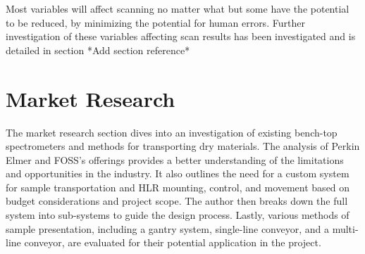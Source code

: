 \documentclass{UoNMCHA}
\numberwithin{equation}{section}
\begin{document}
Most variables will affect scanning no matter what but some have the potential to be reduced, by minimizing the potential for human errors. Further investigation of these variables affecting scan results has been investigated and is detailed in section *Add section reference*\\
\newpage
\section{Market Research}\label{sec:Market Research}
The market research section dives into an investigation of existing bench-top spectrometers and methods for transporting dry materials. The analysis of Perkin Elmer and FOSS's offerings provides a better understanding of the limitations and opportunities in the industry. It also outlines the need for a custom system for sample transportation and HLR mounting, control, and movement based on budget considerations and project scope. The author then breaks down the full system into sub-systems to guide the design process. Lastly, various methods of sample presentation, including a gantry system, single-line conveyor, and a multi-line conveyor, are evaluated for their potential application in the project.\\
\end{document}

